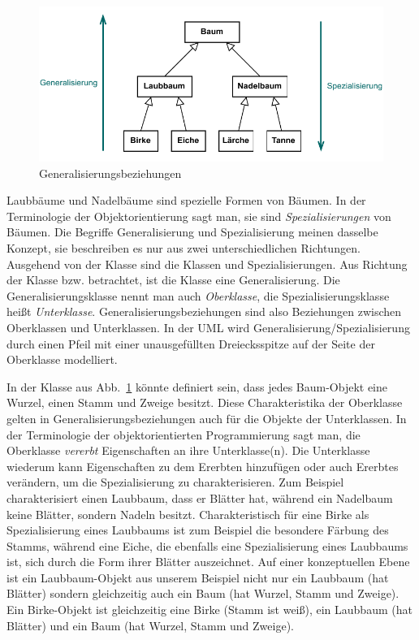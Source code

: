 \begin{figure}[h!]
	\centering
	\includegraphics{Bilder/Kapitel-4/generalisierungsbeziehungen.pdf}
	\caption{Generalisierungsbeziehungen}
	\label{fig:generalisierungsbeziehungen}
\end{figure}

Laubbäume und Nadelbäume sind spezielle Formen von Bäumen. In der Terminologie der Objektorientierung sagt man, sie sind \textit{Spezialisierungen} von Bäumen. Die Begriffe Generalisierung und Spezialisierung meinen dasselbe Konzept, sie beschreiben es nur aus zwei unterschiedlichen Richtungen. Ausgehend von der Klasse  sind die Klassen  und  Spezialisierungen. Aus Richtung der Klasse  bzw.  betrachtet, ist die Klasse  eine Generalisierung. Die Generalisierungsklasse nennt man auch \textit{Oberklasse},
die Spezialisierungsklasse heißt \textit{Unterklasse}. Generalisierungsbeziehungen sind also Beziehungen zwischen Ober\-klassen und Unterklassen. In der UML wird Generalisierung/Spezialisierung durch einen Pfeil mit einer unausgefüllten Dreiecksspitze auf der Seite der Oberklasse modelliert.

In der Klasse  aus Abb.~\ref{fig:generalisierungsbeziehungen} könnte definiert sein, dass jedes Baum-Objekt eine Wurzel, einen Stamm und Zweige besitzt. Diese Charakteristika der Ober\-klasse gelten in Generalisierungsbeziehungen auch für die Objekte der Unterklassen. In der Terminologie der objektorientierten Programmierung sagt man, die Ober\-klasse \textit{vererbt} Eigenschaften an ihre Unterklasse(n). Die Unterklasse wiederum kann Eigenschaften zu dem Ererbten hinzufügen oder auch Ererbtes verändern, um die Spezialisierung zu charakterisieren. Zum Beispiel charakterisiert einen Laubbaum, dass er Blätter hat, während ein Nadelbaum keine Blätter, sondern Nadeln besitzt. Charakteristisch für eine Birke als Spezialisierung eines Laubbaums ist zum Beispiel die besondere Färbung des Stamms, während eine Eiche, die ebenfalls eine Spezialisierung eines Laubbaums ist, sich durch die Form ihrer Blätter auszeichnet. Auf einer konzeptuellen Ebene ist ein Laubbaum-Objekt aus unserem Beispiel nicht nur ein Laubbaum (hat Blätter) sondern gleichzeitig auch ein Baum (hat Wurzel, Stamm und Zweige). Ein Birke-Objekt ist gleichzeitig eine Birke (Stamm ist weiß), ein Laubbaum (hat Blätter) und ein Baum (hat Wurzel, Stamm und Zweige). 